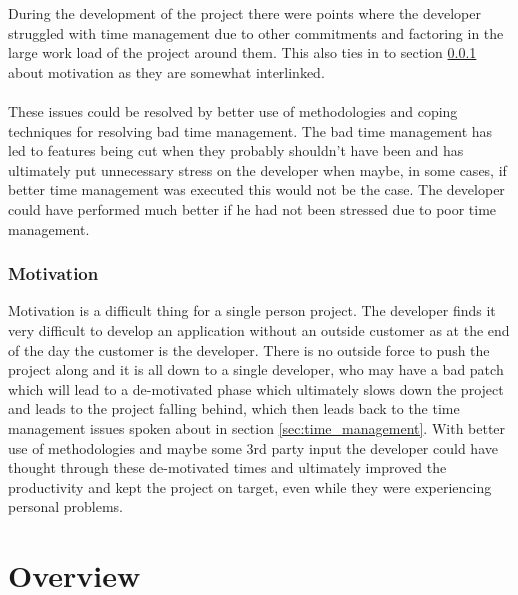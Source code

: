 During the development of the project there were points where the developer struggled with time management due to other commitments and factoring in the large work load of the project around them. This also ties in to section \ref{sec:motivation} about motivation as they are somewhat interlinked.\\
\\
These issues could be resolved by better use of methodologies and coping techniques for resolving bad time management. The bad time management has led to features being cut when they probably shouldn't have been and has ultimately put unnecessary stress on the developer when maybe, in some cases, if better time management was executed this would not be the case. The developer could have performed much better if he had not been stressed due to poor time management.

\subsubsection{Motivation}
\label{sec:motivation}

Motivation is a difficult thing for a single person project. The developer finds it very difficult to develop an application without an outside customer as at the end of the day the customer is the developer. There is no outside force to push the project along and it is all down to a single developer, who may have a bad patch which will lead to a de-motivated phase which ultimately slows down the project and leads to the project falling behind, which then leads back to the time management issues spoken about in section \ref{sec:time_management}. With better use of methodologies and maybe some 3rd party input the developer could have thought through these de-motivated times and ultimately improved the productivity and kept the project on target, even while they were experiencing personal problems.

\section{Overview}

